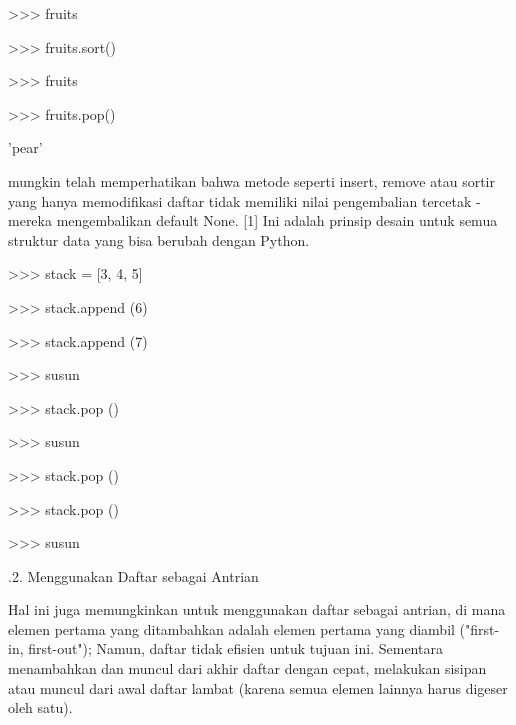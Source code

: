 \documentclass[a4paper,12pt]{report}
\begin{document}
\noindent 
>>> fruits \par
{} \par
\noindent 
>>> fruits.sort() \par
\noindent 
>>> fruits \par
{} \par
\noindent 
>>> fruits.pop() \par
\noindent 
'pear' \par
\vspace{14pt}
\noindent 
{\fontsize{14pt}{14pt}\selectfont mungkin telah memperhatikan bahwa metode seperti insert, remove atau sortir yang hanya memodifikasi daftar tidak memiliki nilai pengembalian tercetak - mereka mengembalikan default None. [1] Ini adalah prinsip desain untuk semua struktur data yang bisa berubah dengan Python. \\} \par
\vspace{14pt}
\noindent 
>>> stack = [3, 4, 5] \par
\noindent 
>>> stack.append (6) \par
\noindent 
>>> stack.append (7) \par
\noindent 
>>> susun \par
\noindent 
[3, 4, 5, 6, 7] \par
\noindent 
>>> stack.pop () \par
{} \par
\noindent 
>>> susun \par
\noindent 
[3, 4, 5, 6] \par
\noindent 
>>> stack.pop () \par
{} \par
\noindent 
>>> stack.pop () \par
{} \par
\noindent 
>>> susun \par
\noindent 
[3, 4] \par
\vspace{12pt}
.2. Menggunakan Daftar sebagai Antrian \par
\vspace{12pt}
\noindent 
Hal ini juga memungkinkan untuk menggunakan daftar sebagai antrian, di mana elemen pertama yang ditambahkan adalah elemen pertama yang diambil ("first-in, first-out"); Namun, daftar tidak efisien untuk tujuan ini. Sementara menambahkan dan muncul dari akhir daftar dengan cepat, melakukan sisipan atau muncul dari awal daftar lambat (karena semua elemen lainnya harus digeser oleh satu). \par
\end{document}
